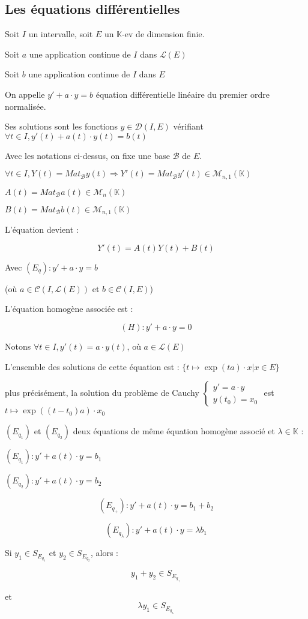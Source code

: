 \documentclass[a4paper,12pt]{book}
\newcommand{\Def}[2]{\begin{tcolorbox}[colback=white,colframe=red!10!green!20!blue!75!, title=Définition : #1]#2\end{tcolorbox}}
\newcommand{\Thr}[2]{\begin{tcolorbox}[sharp corners, colback=white,colframe=red!10!blue!30!green!75!, title=Théorème : #1]#2\end{tcolorbox}}
\def\K{\mathbb{K}}
\begin{document}
\subsection{Les équations différentielles}
\Def{Premier ordre}{Soit $I$ un intervalle, soit $E$ un $\K$-ev de dimension finie.
\par Soit $a$ une application continue de $I$ dans $\mathcal{L}(E)$
\par Soit $b$ une application continue de $I$ dans $E$
\par On appelle $y' + a\cdot y = b$ équation différentielle linéaire du premier ordre normalisée.
\par Ses solutions sont les fonctions $y\in\mathcal{D}(I, E)$ vérifiant $\forall t\in I, y'(t)+a(t)\cdot y(t)=b(t)$}
\Def{Traduction matricielle}{Avec les notations ci-dessus, on fixe une base $\mathcal{B}$ de $E$.
\par $\forall t\in I, Y(t) = Mat_{\mathcal{B}}y(t) \Rightarrow Y'(t) = Mat_\mathcal{B}y'(t)\in\mathcal{M}_{n,1}(\K)$
\par $A(t) = Mat_\mathcal{B}a(t)\in\mathcal{M}_n(\K)$
\par $B(t) = Mat_\mathcal{B}b(t)\in\mathcal{M}_{n,1}(\K)$
\par L'équation devient :
\par $$Y'(t) = A(t)Y(t) +B(t)$$}
\Def{Equation homogène associée}{Avec $(E_q) : y' + a\cdot y = b$
\par (où $a\in\mathcal{C}(I, \mathcal{L}(E))$ et $b\in\mathcal{C}(I,E)$)
\par L'équation homogène associée est :
\par $$(H): y' + a\cdot y = 0$$}
\Thr{Résolution de l'équation différentielle linéaire normalisée à coefficients constants}{Notons $\forall t\in I,y'(t) = a\cdot y(t)$, où $a\in\mathcal{L}(E)$
\par L'ensemble des solutions de cette équation est : $\{t\mapsto \exp(t a)\cdot x\vert x\in E\}$
\par plus précisément, la solution du problème de Cauchy $\left\{\begin{array}{l} y' = a\cdot y \\ y(t_0) = x_0\end{array}\right.$ est $t\mapsto \exp((t-t_0)a)\cdot x_0$
}
\Thr{Superposition}{$(E_{q_1})$ et $(E_{q_2})$ deux équations de même équation homogène associé et $\lambda\in\K$ :
\par $(E_{q_1}) : y' + a(t)\cdot y = b_1$
\par $(E_{q_2}) : y' + a(t)\cdot y = b_2$
\par $$(E_{q_+}) : y' + a(t)\cdot y = b_1+b_2$$
\par $$(E_{q_\lambda}) : y' + a(t)\cdot y = \lambda b_1$$
\par Si $y_1\in S_{E_{q_1}}$ et $y_2\in S_{E_{q_2}}$, alors :
\par $$ y_1+y_2\in S_{E_{q_+}}$$
\par et$$ \lambda y_1 \in S_{E_{q_\lambda}}$$}
\end{document}

